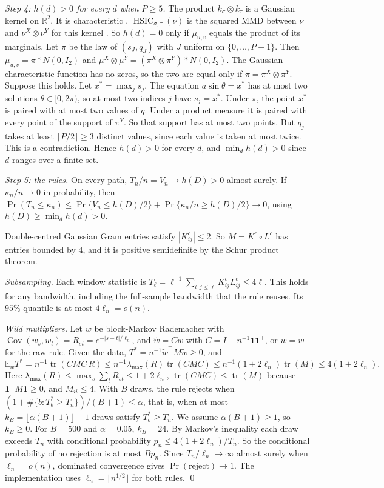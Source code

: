 \documentclass[11pt]{article}
\theoremstyle{remark}
\newcommand{\HSIC}{\operatorname{HSIC}}
\newcommand{\E}{\mathbb E}
\newcommand{\Cov}{\operatorname{Cov}}
\newcommand{\one}{\mathbf 1}
\begin{document}
\emph{Step 4: $h(d)>0$ for every $d$ when $P\ge5$.} The product $k_\sigma\otimes k_\tau$ is a Gaussian kernel on $\mathbb R^2$. It is characteristic \citep{sriperumbudur2010hilbert}. $\HSIC_{\sigma,\tau}(\nu)$ is the squared MMD between $\nu$ and $\nu^X\otimes\nu^Y$ for this kernel \citep{gretton2005measuring}. So $h(d)=0$ only if $\mu_{u,v}$ equals the product of its marginals. Let $\pi$ be the law of $(s_J,q_J)$ with $J$ uniform on $\{0,\ldots,P-1\}$. Then $\mu_{u,v}=\pi*N(0,I_2)$ and $\mu^X\otimes\mu^Y=(\pi^X\otimes\pi^Y)*N(0,I_2)$. The Gaussian characteristic function has no zeros, so the two are equal only if $\pi=\pi^X\otimes\pi^Y$. Suppose this holds. Let $x^*=\max_js_j$. The equation $a\sin\theta=x^*$ has at most two solutions $\theta\in[0,2\pi)$, so at most two indices $j$ have $s_j=x^*$. Under $\pi$, the point $x^*$ is paired with at most two values of $q$. Under a product measure it is paired with every point of the support of $\pi^Y$. So that support has at most two points. But $q_j$ takes at least $\lceil P/2\rceil\ge3$ distinct values, since each value is taken at most twice. This is a contradiction. Hence $h(d)>0$ for every $d$, and $\min_dh(d)>0$ since $d$ ranges over a finite set.

\emph{Step 5: the rules.} On every path, $T_n/n=V_n\to h(D)>0$ almost surely. If $\kappa_n/n\to0$ in probability, then $\Pr(T_n\le\kappa_n)\le\Pr\{V_n\le h(D)/2\}+\Pr\{\kappa_n/n\geq h(D)/2\}\to0$, using $h(D)\ge\min_dh(d)>0$.

Double-centred Gaussian Gram entries satisfy $|K^c_{ij}|\le2$. So $M=K^c\circ L^c$ has entries bounded by $4$, and it is positive semidefinite by the Schur product theorem.

\emph{Subsampling.} Each window statistic is $T_\ell=\ell^{-1}\sum_{i,j\le\ell}K^c_{ij}L^c_{ij}\le4\ell$. This holds for any bandwidth, including the full-sample bandwidth that the rule reuses. Its $95\%$ quantile is at most $4\ell_n=o(n)$.

\emph{Wild multipliers.} Let $w$ be block-Markov Rademacher with $\Cov(w_s,w_t)=R_{st}=e^{-|s-t|/\ell_n}$, and $\tilde w=Cw$ with $C=I-n^{-1}\one\one^\top$, or $\tilde w=w$ for the raw rule. Given the data, $T^*=n^{-1}\tilde w^\top M\tilde w\ge0$, and
\[
\E_wT^*=n^{-1}\operatorname{tr}(CMC\,R)\le n^{-1}\lambda_{\max}(R)\operatorname{tr}(CMC)\le n^{-1}(1+2\ell_n)\operatorname{tr}(M)\le4(1+2\ell_n).
\]
Here $\lambda_{\max}(R)\le\max_s\sum_tR_{st}\le1+2\ell_n$, $\operatorname{tr}(CMC)\le\operatorname{tr}(M)$ because $\one^\top M\one\ge0$, and $M_{ii}\le4$. With $B$ draws, the rule rejects when $(1+\#\{b:T^*_b\ge T_n\})/(B+1)\le\alpha$, that is, when at most $k_B=\lfloor\alpha(B+1)\rfloor-1$ draws satisfy $T^*_b\ge T_n$. We assume $\alpha(B+1)\ge1$, so $k_B\ge0$. For $B=500$ and $\alpha=0.05$, $k_B=24$. By Markov's inequality each draw exceeds $T_n$ with conditional probability $p_n\le4(1+2\ell_n)/T_n$. So the conditional probability of no rejection is at most $Bp_n$. Since $T_n/\ell_n\to\infty$ almost surely when $\ell_n=o(n)$, dominated convergence gives $\Pr(\text{reject})\to1$. The implementation uses $\ell_n=\lfloor n^{1/2}\rfloor$ for both rules. \qed
\end{document}
